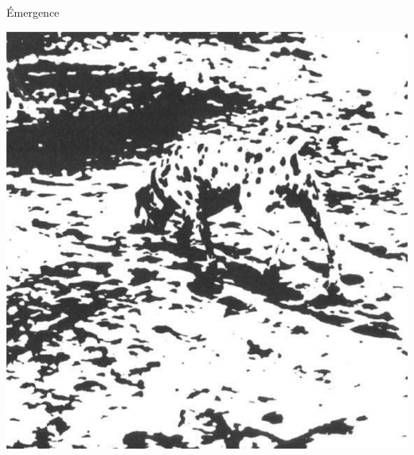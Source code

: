 \documentclass[french]{beamer}
\begin{document}
\begin{frame}{Émergence}
\begin{center}
	\includegraphics[height=0.8\textheight]{dalmatien}
\end{center}
\end{frame}
\end{document}
